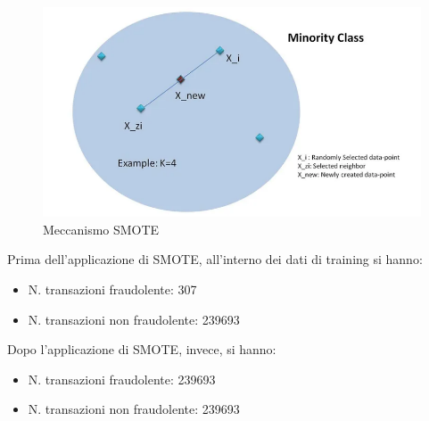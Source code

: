 \documentclass[]{article}
\begin{document}
            \begin{figure}[H]
                \centering
                \includegraphics[width=.45\textwidth]{img/SMOTE.png}
                \caption[short]{Meccanismo SMOTE}
            \end{figure}
            Prima dell'applicazione di SMOTE, all'interno dei dati di training si hanno:
            \begin{itemize}
                \item N. transazioni fraudolente: 307
                \item N. transazioni non fraudolente: 239693
            \end{itemize}
            Dopo l'applicazione di SMOTE, invece, si hanno:
            \begin{itemize}
                \item N. transazioni fraudolente: 239693
                \item N. transazioni non fraudolente: 239693
            \end{itemize}
\end{document}
